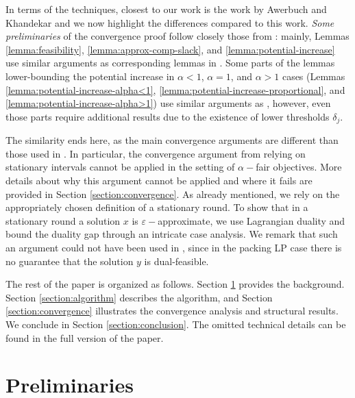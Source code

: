 \documentclass[11pt]{article}
\makeatletter
\renewcommand{\paragraph}{\@startsection{paragraph}{4}{\z@}{1ex \@plus 1ex \@minus .2ex}{-.5em}{\normalfont\normalsize\bfseries}}
\newif\iffullpaper
\makeatother
\begin{document}
{In terms of the techniques, closest to our work is the work by Awerbuch and Khandekar \cite{AwerbuchKhandekar2009} and we now highlight the differences compared to this work. \emph{Some preliminaries} of the convergence proof follow closely those from \cite{AwerbuchKhandekar2009}: mainly, Lemmas \ref{lemma:feasibility}, \ref{lemma:approx-comp-slack}, and \ref{lemma:potential-increase} use similar arguments as corresponding lemmas in \cite{AwerbuchKhandekar2009}. Some parts of the lemmas lower-bounding the potential increase in $\alpha<1$, $\alpha = 1$, and $\alpha>1$ cases (Lemmas \ref{lemma:potential-increase-alpha<1}, \ref{lemma:potential-increase-proportional}, and \ref{lemma:potential-increase-alpha>1}) use similar arguments as \cite{AwerbuchKhandekar2009}, however, even those parts require additional results due to the existence of lower thresholds $\delta_j$.}

{The similarity ends here, as the main convergence arguments are different than those used in \cite{AwerbuchKhandekar2009}. In particular, the convergence argument from \cite{AwerbuchKhandekar2009} relying on stationary intervals cannot be applied in the setting of $\alpha-$fair objectives. More details about why this argument cannot be applied and where it fails are provided in Section \ref{section:convergence}. As already mentioned, we rely on the appropriately chosen definition of a stationary round. To show that in a stationary round a solution $x$ is $\varepsilon-$approximate, we use Lagrangian duality and bound the duality gap through an intricate case analysis. We remark that such an argument could not have been used in \cite{AwerbuchKhandekar2009}, since in the packing LP case there is no guarantee that the solution $y$ is dual-feasible.
}

\paragraph{Organization of the Paper.} The rest of the paper is organized as follows. Section \ref{section:prelims} provides the background. Section \ref{section:algorithm} describes the algorithm, and Section \ref{section:convergence} \iffullpaper provides \else illustrates \fi the convergence analysis and structural results. \iffullpaper Section \ref{section:conclusion} concludes the paper. \else We conclude in Section \ref{section:conclusion}. {The omitted technical details can be found in the full version of the paper.}\fi

\section{Preliminaries}\label{section:prelims}
\end{document}
